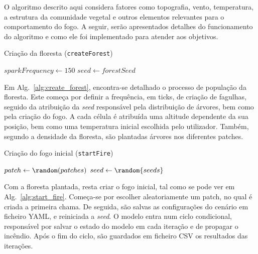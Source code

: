 O algoritmo descrito aqui considera fatores como topografia, vento, temperatura, a estrutura da comunidade vegetal e outros elementos relevantes para o comportamento do fogo. A seguir, serão apresentados detalhes do funcionamento do algoritmo e como ele foi implementado para atender aos objetivos.


\begin{algorithm}
    \caption{Criação da floresta (\texttt{createForest})}\label{alg:create_forest}
    $sparkFrequency \gets 150$\;
    $seed \gets forestSeed$\;
\end{algorithm}

Em Alg.~\ref{alg:create_forest}, encontra-se detalhado o processo de população da floresta. Este começa por definir a frequência, em ticks, de criação de fagulhas, seguido da atribuição da \textit{seed} responsável pela distribuição de árvores, bem como pela criação do fogo. A cada célula é atribuída uma altitude dependente da sua posição, bem como uma temperatura inicial escolhida pelo utilizador. Também, segundo a densidade da floresta, são plantadas árvores nos diferentes patches.


\begin{algorithm}
    \caption{Criação do fogo inicial (\texttt{startFire})}\label{alg:start_fire}
    $patch \gets \random(patches)$\;
    \;
    \saveConfig{}\;
    $seed \gets \random{seeds}$\;
    \While{\anyTreesBurning{}}{
        \saveIteration{}\;
        \fire{}\;
    }
    \saveIterations{}\;
\end{algorithm}

Com a floresta plantada, resta criar o fogo inicial, tal como se pode ver em Alg.~\ref{alg:start_fire}. Começa-se por escolher aleatoriamente um patch, no qual é criada a primeira chama. De seguida, são salvas as configurações do cenário em ficheiro YAML, e reiniciada a \textit{seed}. O modelo entra num ciclo condicional, responsável por salvar o estado do modelo em cada iteração e de propagar o incêndio. Após o fim do ciclo, são guardados em ficheiro CSV os resultados das iterações.

